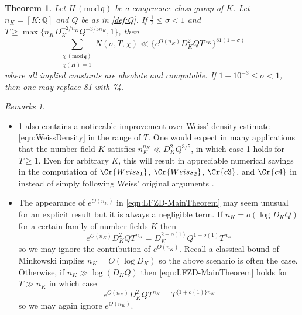 \documentclass[12pt,psamsfonts]{amsart}
\newtheorem{thm}{Theorem}[section]
\theoremstyle{definition}
\theoremstyle{remark}
\numberwithin{equation}{section}
\theoremstyle{plain}
\theoremstyle{remark}
\newtheorem*{remarks}{Remarks}
\renewcommand{\1}{ {\bf 1}}
\renewcommand{\pmod}[1]{\, (\mathrm{mod} {\, #1})}
\newcommand{\kq}{\mathfrak{q}}
\newcommand{\Q}{\mathbb{Q}}
\newcommand{\asif}[1]{\color{red} {\bf Asif:} #1 \color{black}}
\newcommand{\jesse}[1]{\color{blue} {\bf Jesse:} #1 \color{black}}
\begin{document}
\begin{thm}
\label{LFZD-MainTheorem}
Let $H \pmod{\kq}$ be a congruence class group of $K$. Let $n_K=[K:\Q]$ and $Q$ be as in \eqref{def:Q}.  If $\tfrac{1}{2} \leq \sigma < 1$ and $T \geq \max\{  n_K D_K^{-2/n_K} Q^{-3/5n_K}, 1\}$, then 
\begin{equation}
\sum_{\substack{\chi\pmod{\kq} \\ \chi(H) = 1}} N(\sigma, T,\chi) \ll \{ e^{O(n_K)} D_K^{2} Q T^{n_K}\}^{81(1-\sigma)} 
\label{eqn:LFZD-MainTheorem}
\end{equation}
where all implied constants are absolute and computable. If $1- 10^{-3} \leq\sigma<1$, then one may replace 81 with 74.
\end{thm}

\begin{remarks} $ $ 
\begin{itemize}
	\item \cref{LFZD-MainTheorem} also contains a noticeable improvement over Weiss' density estimate \eqref{eqn:WeissDensity} in the range of $T$. One would expect in many applications that the number field $K$ satisfies $n_K^{n_K} \ll D_K^2 Q^{3/5}$, in which case \cref{LFZD-MainTheorem} holds for $T \geq 1$. Even for arbitrary $K$, this will result in appreciable numerical savings in the computation of $\Cr{Weiss_1}$, $\Cr{Weiss_2}$, $\Cr{c3}$, and $\Cr{c4}$ in \cite{Zaman3} instead of simply following Weiss' original arguments \cite[Sections 5-6]{Weiss}.
	\item The appearance of $e^{O(n_K)}$ in \eqref{eqn:LFZD-MainTheorem} may seem unusual for an explicit result but it is always a negligible term. If $n_K = o(\log D_KQ)$ for a certain family of number fields $K$ then
		\[
		e^{O(n_K)} D_K^{2} Q T^{n_K} = D_K^{2+o(1)} Q^{1+o(1)} T^{n_K}
		\]
		so we may ignore the contribution of $e^{O(n_K)}$. Recall a classical bound of Minkowski implies $n_K = O(\log D_K)$ so the above scenario is often the case. Otherwise, if $n_K \gg \log (D_KQ)$ then \eqref{eqn:LFZD-MainTheorem} holds for $T \gg n_K$ in which case 
		\[
		e^{O(n_K)} D_K^{2} Q T^{n_K} = T^{\{1+o(1)\}n_K}
		\]
		so we may again ignore $e^{O(n_K)}$. 
\end{itemize}
\end{remarks} 

\end{document}
